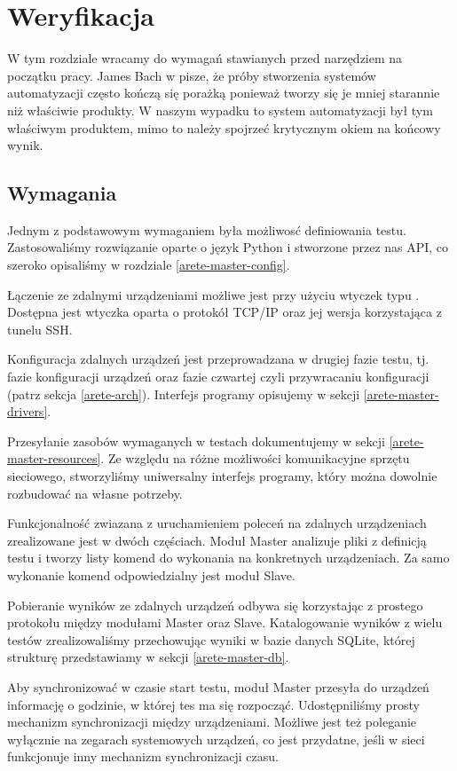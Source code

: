 \documentclass[00-praca-magisterska.tex]{subfiles}
\begin{document}
\chapter{Weryfikacja}

W tym rozdziale wracamy do wymagań stawianych przed narzędziem na początku
pracy. James Bach w \cite{snake-oil} pisze, że próby stworzenia systemów
automatyzacji często kończą się porażką ponieważ tworzy się je mniej starannie
niż właściwie produkty. W naszym wypadku to system automatyzacji był tym
właściwym produktem, mimo to należy spojrzeć krytycznym okiem na końcowy wynik.

\section{Wymagania}

Jednym z podstawowym wymaganiem była możliwosć definiowania testu.
Zastosowaliśmy rozwiązanie oparte o język Python i stworzone przez nas API, co
szeroko opisaliśmy w rozdziale \ref{arete-master-config}.

Łączenie ze zdalnymi urządzeniami możliwe jest przy użyciu wtyczek typu
. Dostępna jest wtyczka oparta o protokół TCP/IP oraz
jej wersja korzystająca z tunelu SSH.

Konfiguracja zdalnych urządzeń jest przeprowadzana w drugiej fazie testu, tj.
fazie konfiguracji urządzeń oraz fazie czwartej czyli przywracaniu
konfiguracji (patrz sekcja \ref{arete-arch}). Interfejs programy opisujemy w
sekcji \ref{arete-master-drivers}.

Przesyłanie zasobów wymaganych w testach dokumentujemy w sekcji
\ref{arete-master-resources}. Ze względu na różne możliwości komunikacyjne
sprzętu sieciowego, stworzyliśmy uniwersalny interfejs programy, który można
dowolnie rozbudować na własne potrzeby.

Funkcjonalność zwiazana z uruchamieniem poleceń na zdalnych urządzeniach
zrealizowane jest w dwóch częściach. Moduł Master analizuje pliki z definicją
testu i tworzy listy komend do wykonania na konkretnych urządzeniach. Za samo
wykonanie komend odpowiedzialny jest moduł Slave.

Pobieranie wyników ze zdalnych urządzeń odbywa się korzystając z prostego
protokołu między modułami Master oraz Slave. Katalogowanie wyników z wielu
testów zrealizowaliśmy przechowując wyniki w bazie danych SQLite, której
strukturę przedstawiamy w sekcji \ref{arete-master-db}.

Aby synchronizować w czasie start testu, moduł Master przesyła do urządzeń
informację o godzinie, w której tes ma się rozpocząć. Udostępniliśmy prosty
mechanizm synchronizacji między urządzeniami. Możliwe jest też poleganie
wyłącznie na zegarach systemowych urządzeń, co jest przydatne, jeśli w sieci
funkcjonuje inny mechanizm synchronizacji czasu.
\end{document}
